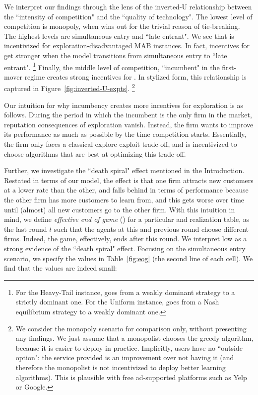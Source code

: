 \documentclass[../competing_bandits_with_appendix.tex]{subfiles}
\begin{document}
We interpret our findings through the lens of the inverted-U relationship between the ``intensity of competition" and the ``quality of technology". The lowest level of competition is monopoly, when \DynamicGreedy wins out for the trivial reason of tie-breaking. The highest levels are simultaneous entry and ``late entrant". We see that \DynamicGreedy is incentivized for exploration-disadvantaged MAB instances. In fact, incentives for \DynamicGreedy get stronger when the model transitions from simultaneous entry to ``late entrant".%
\footnote{For the Heavy-Tail instance, \DynamicGreedy goes from a weakly dominant strategy to a strictly dominant one. For the Uniform instance, \DynamicGreedy goes from a Nash equilibrium strategy to a weakly dominant one.}
Finally, the middle level of competition, ``incumbent" in the first-mover regime creates strong incentives for \Thompson. In stylized form, this relationship is captured in Figure~\ref{fig:inverted-U-expts}.%
\footnote{We consider the monopoly scenario for comparison only, without presenting any findings. We just assume that a monopolist chooses
the greedy algorithm, because it is easier to deploy in practice. Implicitly, users have no ``outside option": the service provided is an improvement over not having it (and therefore the monopolist is not incentivized to deploy better learning algorithms). This is plausible with free ad-supported platforms such as Yelp or Google.}



Our intuition for why incumbency creates more incentives for exploration is as follows. During the period in which the incumbent is the only firm in the market, reputation consequences of exploration vanish. Instead, the firm wants to improve its performance as much as possible by the time competition starts. Essentially, the firm only faces a classical explore-exploit trade-off, and is incentivized to choose algorithms that are best at optimizing this trade-off.

Further, we investigate the ``death spiral" effect mentioned in the Introduction. Restated in terms of our model, the effect is that one firm attracts new customers at a lower rate than the other, and falls behind in terms of performance because the other firm has more customers to learn from, and this gets worse over time until (almost) all new customers go to the other firm. With this intuition in mind, we define  \textit{effective end of game} (\Eeog) for a particular \MRV and realization table, as the last round $t$ such that the agents at this and previous round choose different firms. Indeed, the game, effectively, ends after this round. We interpret low \Eeog as a strong evidence of the ``death spiral" effect. Focusing on the simultaneous entry scenario, we specify the \Eeog values in Table~\ref{fig:eog} (the second line of each cell). We find that the \Eeog values are indeed small:
\end{document}

